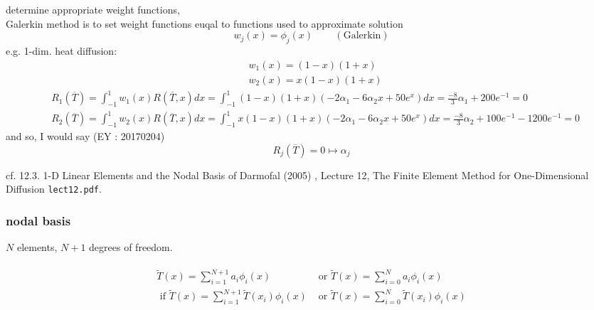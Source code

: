 \documentclass[10pt]{amsart}
\begin{document}
\begin{multicols*}{2}
determine appropriate weight functions, \\
Galerkin method is to set weight functions euqal to functions used to approximate solution
\[
w_j(x) = \phi_j(x) \qquad \, (\text{Galerkin})
\]
e.g. 1-dim. heat diffusion:
\[
\begin{aligned}
  & w_1(x) = (1-x)(1+x) \\ 
  & w_2(x) = x(1-x)(1+x)
\end{aligned}
\]
\[
\begin{aligned}
  & R_1(\overline{T}) = \int_{-1}^1 w_1(x)R(\overline{T},x) dx = \int_{-1}^1 (1-x)(1+x)(-2\alpha_1 - 6\alpha_2x + 50e^x)dx= \frac{-8}{3}\alpha_1 + 200e^{-1} = 0 \\
  & R_2(\overline{T}) = \int_{-1}^1 w_2(x)R(\overline{T},x) dx = \int_{-1}^1 x(1-x)(1+x)(-2\alpha_1 - 6\alpha_2x + 50e^x)dx= \frac{-8}{3}\alpha_2 + 100e^{-1} -1200 e^{-1}= 0 
\end{aligned}
\]
and so, I would say (EY : 20170204)
\begin{equation}
  R_j(\overline{T}) =0 \mapsto \alpha_j
  \end{equation}


cf. 12.3. 1-D Linear Elements and the Nodal Basis of Darmofal (2005) \cite{Darm2005}, Lecture 12, The Finite Element Method for One-Dimensional Diffusion \verb|lect12.pdf|.

\subsubsection{nodal basis}

$N$ elements, $N+1$ degrees of freedom.

\[
\begin{gathered}
  \begin{aligned}
    \widetilde{T}(x) = \sum_{i=1}^{N+1} a_i \phi_i(x) & \text{ or } \widetilde{T}(x) = \sum_{i=0}^N a_i \phi_i(x) \\ 
 \text{ if } \widetilde{T}(x) = \sum_{i=1}^{N+1} \widetilde{T}(x_i) \phi_i(x) & \text{ or } \widetilde{T}(x) = \sum_{i=0}^N \widetilde{T}(x_i) \phi_i(x)
\end{aligned}
\end{gathered}
\]


\end{multicols*}
\end{document}
